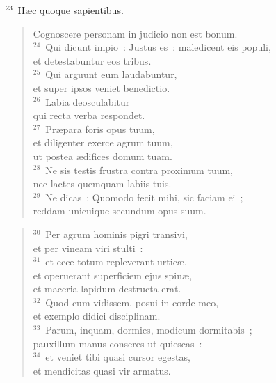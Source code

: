 ${}^{23}$~H\ae c quoque sapientibus. \begin{flushleft}\begin{verse}Cognoscere personam in judicio non est bonum.\\
${}^{24}$~Qui dicunt impio~: Justus es~: maledicent eis populi,\\ et detestabuntur eos tribus.\\
${}^{25}$~Qui arguunt eum laudabuntur,\\ et super ipsos veniet benedictio.\\
${}^{26}$~Labia deosculabitur\\ qui recta verba respondet.\\
${}^{27}$~Pr\ae para foris opus tuum,\\ et diligenter exerce agrum tuum,\\ ut postea \ae difices domum tuam.\\
${}^{28}$~Ne sis testis frustra contra proximum tuum,\\ nec lactes quemquam labiis tuis.\\
${}^{29}$~Ne dicas~: Quomodo fecit mihi, sic faciam ei~;\\ reddam unicuique secundum opus suum.\end{verse}\end{flushleft}


\begin{flushleft}\begin{verse}${}^{30}$~Per agrum hominis pigri transivi,\\ et per vineam viri stulti~:\\
${}^{31}$~et ecce totum repleverant urtic\ae ,\\ et operuerant superficiem ejus spin\ae ,\\ et maceria lapidum destructa erat.\\
${}^{32}$~Quod cum vidissem, posui in corde meo,\\ et exemplo didici disciplinam.\\
${}^{33}$~Parum, inquam, dormies, modicum dormitabis~;\\ pauxillum manus conseres ut quiescas~:\\
${}^{34}$~et veniet tibi quasi cursor egestas,\\ et mendicitas quasi vir armatus.\end{verse}\end{flushleft}



